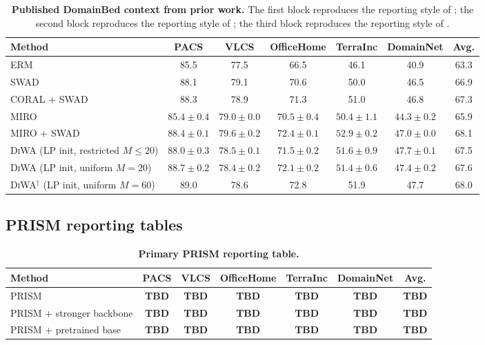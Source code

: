 \documentclass{article}
\newcommand{\TBD}{\textbf{TBD}}
\newcommand{\prism}{\textup{\textsc{PRISM}}}
\newcommand{\swad}{\textup{\textsc{SWAD}}}
\newcommand{\diwa}{\textup{\textsc{DiWA}}}
\newcommand{\miro}{\textup{\textsc{MIRO}}}
\newcommand{\erm}{\textup{\textsc{ERM}}}
\newcommand{\1}{\mathbbm{1}}
\begin{document}
\begin{table}[t]
    \centering
    \small
    \caption{\textbf{Published DomainBed context from prior work.} The first block reproduces the reporting style of \citet{cha2021swad}; the second block reproduces the reporting style of \citet{cha2022miro}; the third block reproduces the reporting style of \citet{rame2022diwa}.}
    \label{tab:published_context}
    \setlength{\tabcolsep}{5pt}
    \begin{tabular}{lcccccc}
        \toprule
        Method & PACS & VLCS & OfficeHome & TerraInc & DomainNet & Avg. \\
        \midrule
        \erm{} \citep{cha2021swad} & 85.5 & 77.5 & 66.5 & 46.1 & 40.9 & 63.3 \\
        \swad{} \citep{cha2021swad} & 88.1 & 79.1 & 70.6 & 50.0 & 46.5 & 66.9 \\
        CORAL + \swad{} \citep{cha2021swad} & 88.3 & 78.9 & 71.3 & 51.0 & 46.8 & 67.3 \\
        \midrule
        \miro{} \citep{cha2022miro} & \(85.4\pm0.4\) & \(79.0\pm0.0\) & \(70.5\pm0.4\) & \(50.4\pm1.1\) & \(44.3\pm0.2\) & 65.9 \\
        \miro{} + \swad{} \citep{cha2022miro} & \(88.4\pm0.1\) & \(79.6\pm0.2\) & \(72.4\pm0.1\) & \(52.9\pm0.2\) & \(47.0\pm0.0\) & 68.1 \\
        \midrule
        \diwa{} (LP init, restricted \(M\le 20\)) \citep{rame2022diwa} & \(88.0\pm0.3\) & \(78.5\pm0.1\) & \(71.5\pm0.2\) & \(51.6\pm0.9\) & \(47.7\pm0.1\) & 67.5 \\
        \diwa{} (LP init, uniform \(M=20\)) \citep{rame2022diwa} & \(88.7\pm0.2\) & \(78.4\pm0.2\) & \(72.1\pm0.2\) & \(51.4\pm0.6\) & \(47.4\pm0.2\) & 67.6 \\
        \diwa{}$^\dagger$ (LP init, uniform \(M=60\)) \citep{rame2022diwa} & 89.0 & 78.6 & 72.8 & 51.9 & 47.7 & 68.0 \\
        \bottomrule
    \end{tabular}
\end{table}

\subsection{\prism{} reporting tables}

\begin{table}[t]
    \centering
    \small
    \caption{\textbf{Primary \prism{} reporting table.}}
    \label{tab:prism_tbd}
    \setlength{\tabcolsep}{7pt}
    \begin{tabular}{lcccccc}
        \toprule
        Method & PACS & VLCS & OfficeHome & TerraInc & DomainNet & Avg. \\
        \midrule
        \prism{} & \TBD & \TBD & \TBD & \TBD & \TBD & \TBD \\
        \prism{} + stronger backbone & \TBD & \TBD & \TBD & \TBD & \TBD & \TBD \\
        \prism{} + pretrained base & \TBD & \TBD & \TBD & \TBD & \TBD & \TBD \\
        \bottomrule
    \end{tabular}
\end{table}
\end{document}
